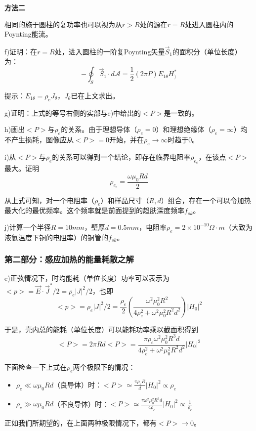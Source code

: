 \textbf{方法二}

相同的施于圆柱的复功率也可以视为从$r>R$处的源在$r=R$处进入圆柱内的Poynting能流。

f)证明：在$r=R$处，进入圆柱的一阶复Poynting矢量$\vec{S}_1$的面积分（单位长度）为：
$$-\oint_{\mathcal{S}}\vec{S}_1 \cdot d\mathcal{A}=\frac{1}{2}(2\pi P)E_{1\theta} H_)^*$$

提示：$E_{1\theta}=\rho_e J_\theta$，$J_\theta$已在上文求出。

g)证明：上式的等号右侧的实部与e)中给出的$<P>$是一致的。

h)画出$<P>$与$\rho_e$的关系。由于理想导体（$\rho_e=0$）和理想绝缘体（$\rho_e=\infty$）均不产生损耗，图像应从$<P>=0$开始，并在$\rho_e \rightarrow \infty$时趋于0。

i)从$<P>$与$\rho_e$的关系可以得到一个结论，即存在临界电阻率$\rho_{e_c}$，在该点$<P>$最大。证明
$$\rho_{e_c}=\frac{\omega \mu_0 R d}{2}$$

从上式可知，对一个电阻率（$\rho_e$）和样品尺寸（$R,d$）组合，存在一个可以令加热最大化的最优频率。这个频率就是前面提到的趋肤深度频率$f_{sk}$。

j)计算一个半径$R=10mm$，壁厚$d=0.5mm$，电阻率$\rho_e=2\times 10^{-10} \Omega\cdot m$（大致为液氦温度下铜的电阻率）的铜管的$f_{sk}$。

\subsubsection*{第二部分：感应加热的能量耗散之解}
e)正弦情况下，时均能耗（单位长度）功率可以表示为$<p>=\vec{E}\cdot \vec{J}^* /2=\rho_e |J|^2 /2$，也即
$$<p>=\rho_e |J|^2 /2=\frac{\rho_e}{2}(\frac{\omega^2 \mu_0^2 R^2}{4\rho_e^2+\omega^2 \mu_0^2 R^2 d^2})|H_0|^2$$

于是，壳内总的能耗（单位长度）可以能耗功率乘以截面积得到
$$<P>=2\pi R d<P>=\frac{\pi \rho_e \omega^2 \mu_0^2 R^3 d}{4\rho_e^2+\omega^2 \mu_0^2 R^2 d^2}|H_0|^2$$

下面检查一下上式在$\rho_e$两个极限下的情况：
\begin{itemize}
  \item $\rho_e \ll \omega \mu_0 R d$（良导体）时：$<P>\simeq \frac{\pi \rho_e R}{d}|H_0|^2\propto \rho_e$
  \item $\rho_e \gg \omega \mu_0 R d$（不良导体）时：$<P>\simeq \frac{\pi \omega^2 \mu_0^2 R^3 d}{4\rho_e}|H_0|^2\propto \frac{1}{\rho_e}$
\end{itemize}

正如我们所期望的，在上面两种极限情况下，都有$<P>\rightarrow 0$。

